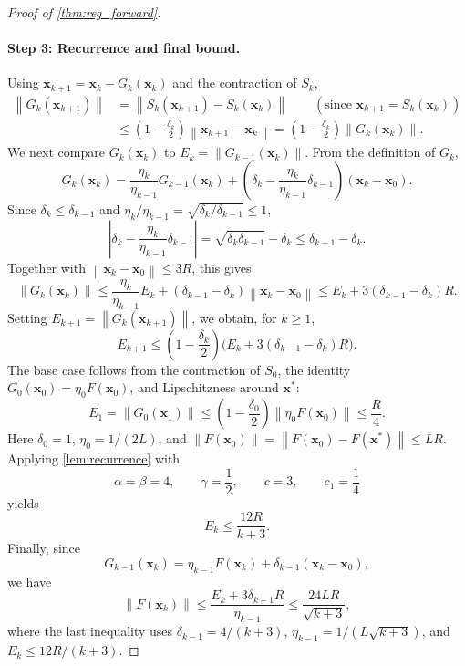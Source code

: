 \documentclass[letterpaper,11pt]{article}
\newcommand{\norm}[1]{\left\| #1 \right\|}
\newcommand{\vect}[1]{\mathbf{#1}}
\begin{document}
\begin{proof}[Proof of \cref{thm:reg_forward}]
\paragraph{Step 3: Recurrence and final bound.}
Using \(\vect{x}_{k+1}=\vect{x}_k-G_k(\vect{x}_k)\) and the contraction of
\(S_k\),
\begin{align*}
    \norm{G_k(\vect{x}_{k+1})}
    &=
    \norm{S_k(\vect{x}_{k+1})-S_k(\vect{x}_k)}
    \qquad(\text{since }\vect{x}_{k+1}=S_k(\vect{x}_k)) \\
    &\le
    \left(1-\frac{\delta_k}{2}\right)\norm{\vect{x}_{k+1}-\vect{x}_k}
    =
    \left(1-\frac{\delta_k}{2}\right)\norm{G_k(\vect{x}_k)}.
\end{align*}
We next compare \(G_k(\vect{x}_k)\) to
\(E_k=\norm{G_{k-1}(\vect{x}_k)}\). From the definition of \(G_k\),
\[
    G_k(\vect{x}_k)
    =
    \frac{\eta_k}{\eta_{k-1}}G_{k-1}(\vect{x}_k)
    +
    \left(\delta_k-\frac{\eta_k}{\eta_{k-1}}\delta_{k-1}\right)
    (\vect{x}_k-\vect{x}_0).
\]
Since \(\delta_k\le\delta_{k-1}\) and
\(\eta_k/\eta_{k-1}=\sqrt{\delta_k/\delta_{k-1}}\le1\),
\[
    \left|\delta_k-\frac{\eta_k}{\eta_{k-1}}\delta_{k-1}\right|
    =
    \sqrt{\delta_k\delta_{k-1}}-\delta_k
    \le
    \delta_{k-1}-\delta_k.
\]
Together with \(\norm{\vect{x}_k-\vect{x}_0}\le3R\), this gives
\[
    \norm{G_k(\vect{x}_k)}
    \le
    \frac{\eta_k}{\eta_{k-1}}E_k
    +(\delta_{k-1}-\delta_k)\norm{\vect{x}_k-\vect{x}_0}
    \le
    E_k+3(\delta_{k-1}-\delta_k)R.
\]
Setting \(E_{k+1}=\norm{G_k(\vect{x}_{k+1})}\), we obtain, for \(k\ge1\),
\[
    E_{k+1}
    \le
    \left(1-\frac{\delta_k}{2}\right)
    \bigl(E_k+3(\delta_{k-1}-\delta_k)R\bigr).
\]
The base case follows from the contraction of \(S_0\), the identity
\(G_0(\vect{x}_0)=\eta_0F(\vect{x}_0)\), and Lipschitzness around
\(\vect{x}^*\):
\[
    E_1
    =
    \norm{G_0(\vect{x}_1)}
    \le
    \left(1-\frac{\delta_0}{2}\right)\norm{\eta_0F(\vect{x}_0)}
    \le
    \frac{R}{4}.
\]
Here \(\delta_0=1\), \(\eta_0=1/(2L)\), and
\(\norm{F(\vect{x}_0)}=\norm{F(\vect{x}_0)-F(\vect{x}^*)}\le LR\).
Applying \cref{lem:recurrence} with
\[
    \alpha=\beta=4,\qquad
    \gamma=\frac12,\qquad
    c=3,\qquad
    c_1=\frac14
\]
yields
\[
    E_k\le\frac{12R}{k+3}.
\]
Finally, since
\[
    G_{k-1}(\vect{x}_k)
    =
    \eta_{k-1}F(\vect{x}_k)
    +\delta_{k-1}(\vect{x}_k-\vect{x}_0),
\]
we have
\[
    \norm{F(\vect{x}_k)}
    \le
    \frac{E_k+3\delta_{k-1}R}{\eta_{k-1}}
    \le
    \frac{24LR}{\sqrt{k+3}},
\]
where the last inequality uses
\(\delta_{k-1}=4/(k+3)\), \(\eta_{k-1}=1/(L\sqrt{k+3})\), and
\(E_k\le12R/(k+3)\).
\end{proof}
\end{document}
